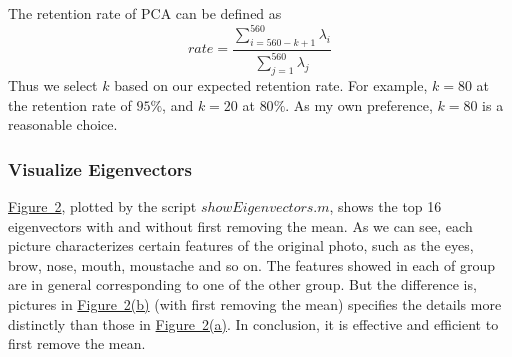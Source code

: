 \documentclass{article}
\begin{document}
The retention rate of PCA can be defined as
\[
rate = \frac{\sum_{i=560-k+1}^{560} \lambda_i}{\sum_{j=1}^{560} \lambda_j}
\]
Thus we select $k$ based on our expected retention rate. For example, $k=80$ at the retention rate of $95\%$, and $k=20$ at $80\%$. As my own preference, $k=80$ is a reasonable choice.

\subsubsection{Visualize Eigenvectors}
\hyperref[fig-2]{Figure~2}, plotted by the script $showEigenvectors.m$, shows the top 16 eigenvectors with and without first removing the mean. As we can see, each picture characterizes certain features of the original photo, such as the eyes, brow, nose, mouth, moustache and so on. The features showed in each of group are in general corresponding to one of the other group. But the difference is, pictures in \hyperref[subfig-2(b)]{Figure~2(b)} (with first removing the mean) specifies the details more distinctly than those in \hyperref[subfig-2(a)]{Figure~2(a)}. In conclusion, it is effective and efficient to first remove the mean.
\end{document}
